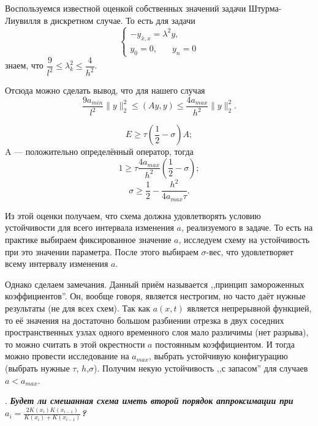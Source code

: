 \documentclass[12pt, a4paper]{article}
\newcounter{mycounter}
\newcommand{\quastion}[1]{%
	\stepcounter{mycounter}%
	\textbf{\themycounter}.  %
	\textbf{\textit{#1}}
	
}
\begin{document}
	Воспользуемся известной оценкой собственных значений задачи Штурма-Лиувилля в дискретном случае. То есть для задачи
	\[
	\begin{cases}
		-y_{\bar{x},x} = \lambda^2y,\\
		y_0 = 0, \phantom{xxx} y_n = 0
	\end{cases}
	\] 
	знаем, что $\dfrac{9}{l^2} \le \lambda^2_k \le \dfrac{4}{h^2}$.
	
	Отсюда можно сделать вывод, что для нашего случая
	\[
	\dfrac{9a_{min}}{l^2}\|y\|^2_2 \le (Ay,y) \le \dfrac{4a_{max}}{h^2}\|y\|^2_2.
	\]
	
	\[
	E \ge \tau(\frac{1}{2}-\sigma)A;
	\]
	A --- положительно определённый оператор, тогда
	\[
	1 \ge \tau \dfrac{4a_{max}}{h^2}(\frac12 - \sigma);
	\]
	\[
	\sigma \ge \dfrac12 - \dfrac{h^2}{4a_{max}\tau}.
	\]
	
	Из этой оценки получаем, что схема должна удовлетворять условию устойчивости для всего интервала изменения $a$, реализуемого в задаче. То есть на практике выбираем фиксированное значение $a$, исследуем схему на устойчивость при это значении параметра. После этого выбираем $\sigma$-вес, что удовлетворяет всему интервалу изменения $a$.
	
	Однако сделаем замечания. Данный приём называется ,,принцип замороженных коэффициентов''. Он, вообще говоря, является нестрогим, но часто даёт нужные результаты (не для всех схем). Так как $a(x,t)$ является непрерывной функцией, то её значения на достаточно большом разбиении отрезка в двух соседних пространственных узлах одного временного слоя мало различимы (нет разрыва), то можно считать в этой окрестности $a$ постоянным коэффициентом. И тогда можно провести исследование на $a_{max}$, выбрать устойчивую конфигурацию (выбрать нужные $\tau$, $h$,$\sigma$). Получим некую устойчивость ,,с запасом'' для случаев $a < a_{max}$.    
	
	
	\clearpage %
	\quastion{Будет ли смешанная схема иметь второй порядок аппроксимации при $a_i = \frac{2 K(x_i) K(x_{i-1})}{K(x_i) + K(x_{i-1})}$?}
	
\end{document}
